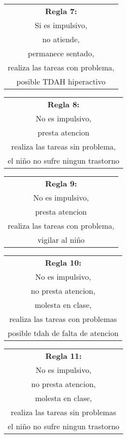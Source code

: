\documentclass[letterpaper,12pt]{article}
\begin{document}
\begin{center}
	\begin{tabular}{|c|}
		\hline 
		\textbf{Regla 7:} \\
		Si es impulsivo, \\
		no atiende, \\
		permanece sentado, \\
		realiza las tareas con problema, \\
		posible TDAH hiperactivo \\
		\hline 
	\end{tabular} 
\end{center}

\begin{center}
	\begin{tabular}{|c|}
		\hline 
		\textbf{Regla 8:} \\
		No es impulsivo,\\
		presta atencion\\
		realiza las tareas sin problema,\\
		el niño no sufre ningun trastorno\\
		\hline 
		\end{tabular} 
\end{center}	
\begin{center}
	\begin{tabular}{|c|}
		\hline 
		\textbf{Regla 9:} \\
		No es impulsivo,\\
		presta atencion\\
		realiza las tareas con problema,\\
		vigilar al niño\\
		\hline 
			\end{tabular} 
	\end{center}
\begin{center}
	\begin{tabular}{|c|}
		\hline 
		\textbf{Regla 10:} \\
		No es impulsivo,\\
		no presta atencion,\\
		molesta en clase,\\
		realiza las tareas con problemas\\
		posible tdah de falta de atencion\\
		\hline 
		\end{tabular} 
	\end{center}
\begin{center}
	\begin{tabular}{|c|}
		\hline 
		\textbf{Regla 11:} \\
		No es impulsivo,\\
		no presta atencion,\\
		molesta en clase,\\
		realiza las tareas sin problemas\\
		el niño no sufre ningun trastorno\\
		\hline 
		\end{tabular} 
	\end{center}
\end{document}
